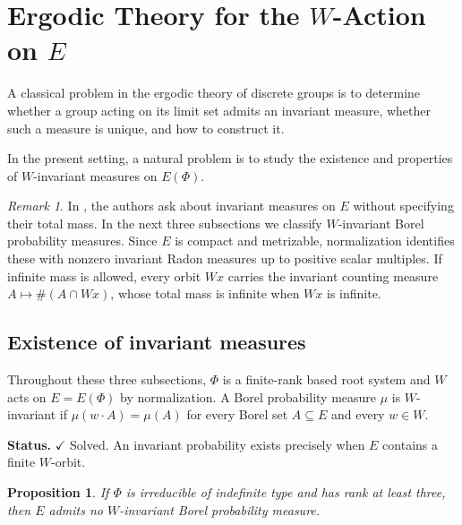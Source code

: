 \documentclass[11pt,reqno]{amsart}
\theoremstyle{plain}
\newtheorem{proposition}[theorem]{Proposition}
\theoremstyle{definition}
\theoremstyle{remark}
\newtheorem{remark}[theorem]{Remark}
\numberwithin{equation}{section}
\begin{document}
\section{Ergodic Theory for the \texorpdfstring{$W$}{W}-Action on \texorpdfstring{$E$}{E}}

A classical problem in the ergodic theory of discrete
groups is to determine whether a group acting on its
limit set admits an invariant measure, whether such
a measure is unique, and how to construct it.

In the present setting, a natural problem is to study
the existence and properties of $W$-invariant measures
on $E(\Phi)$.

\begin{remark}
In \cite[Section~7.6]{DHR}, the authors ask about invariant measures
on $E$ without specifying their total mass. In the next three
subsections we classify $W$-invariant Borel probability measures.
Since $E$ is compact and metrizable, normalization identifies these
with nonzero invariant Radon measures up to positive scalar multiples.
If infinite mass is allowed, every orbit $Wx$ carries the invariant
counting measure $A\mapsto\#(A\cap Wx)$, whose total mass is infinite
when $Wx$ is infinite.
\end{remark}

\subsection{Existence of invariant measures}
Throughout these three subsections, $\Phi$ is a finite-rank based root
system and $W$ acts on $E=E(\Phi)$ by normalization.
A Borel probability measure $\mu$ is $W$-invariant if
$\mu(w\cdot A)=\mu(A)$ for every Borel set $A\subseteq E$ and every
$w\in W$.

\noindent\textbf{Status.} $\checkmark$ Solved. An invariant probability
exists precisely when $E$ contains a finite $W$-orbit.

\begin{proposition}\label{prop:limit-root-invariant-probability}
If $\Phi$ is irreducible of indefinite type and has rank at least
three, then $E$ admits no $W$-invariant Borel probability measure.
\end{proposition}
\end{document}
